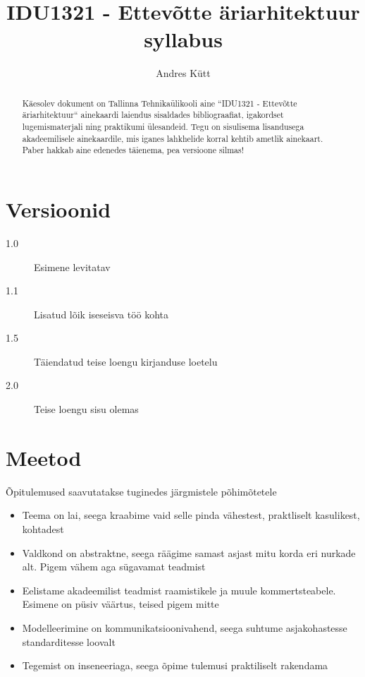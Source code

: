 \documentclass[nobib]{tufte-handout}
\title{IDU1321 - Ettevõtte äriarhitektuur syllabus}
\author[Andres Kütt]{Andres Kütt}
\begin{document}
\maketitle
\begin{abstract}
\noindent
Käesolev dokument on Tallinna Tehnikaülikooli aine ``IDU1321 - Ettevõtte äriarhitektuur`` ainekaardi laiendus sisaldades bibliograafiat, igakordset lugemismaterjali ning praktikumi ülesandeid. Tegu on sisulisema lisandusega akadeemilisele ainekaardile, mis iganes lahkhelide korral kehtib ametlik ainekaart. Paber hakkab aine edenedes täienema, pea versioone silmas!
\end{abstract}

\section{Versioonid}
\begin{description}
	\item[1.0] Esimene levitatav 
	\item[1.1] Lisatud lõik iseseisva töö kohta
	\item[1.5] Täiendatud teise loengu kirjanduse loetelu
	\item[2.0] Teise loengu sisu olemas
\end{description}

\section{Meetod}
Õpitulemused saavutatakse tuginedes järgmistele põhimõtetele
\begin{itemize}
	\item Teema on lai, seega kraabime vaid selle pinda vähestest, praktliselt kasulikest, kohtadest
	\item Valdkond on abstraktne, seega räägime samast asjast mitu korda eri nurkade alt. Pigem vähem aga sügavamat teadmist
	\item Eelistame akadeemilist teadmist raamistikele ja muule kommertsteabele. Esimene on püsiv väärtus, teised pigem mitte
	\item Modelleerimine on kommunikatsioonivahend, seega suhtume asjakohastesse standarditesse loovalt
	\item Tegemist on inseneeriaga, seega õpime tulemusi praktiliselt rakendama
\end{itemize}
\end{document}
